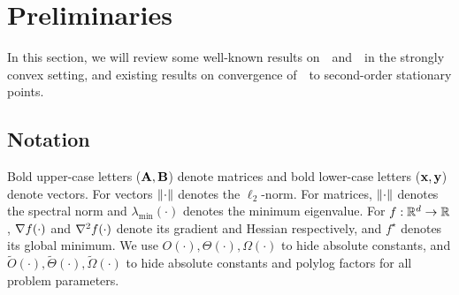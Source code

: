 
\section{Preliminaries}
In this section, we will review some well-known results on~\gd~and~\nag~in the strongly convex setting, 
and existing results on convergence of~\gd~to second-order stationary points. 


\subsection{Notation}
Bold upper-case letters ($\mathbf{A}, \mathbf{B}$) denote matrices and bold lower-case letters ($\mathbf{x}, \mathbf{y}$) denote vectors. 
For vectors $\left\|{\cdot}\right\|$ denotes the $\ell_2$-norm. For matrices, $\left\|{\cdot}\right\|$ denotes the spectral norm and $\lambda_{\min}(\cdot)$ denotes the minimum eigenvalue.
For $f: \mathbb{R}^d \rightarrow \mathbb{R}$, $\nabla f(\cdot)$ and  $\nabla^2 f(\cdot)$ denote its gradient and Hessian respectively, and $f^\star$ denotes its global minimum.
We use $O(\cdot), \Theta(\cdot), \Omega(\cdot)$ to hide absolute constants, and $\tilde{O}(\cdot), \tilde{\Theta}(\cdot), \tilde{\Omega}(\cdot)$ to hide absolute constants and polylog factors for all problem parameters. 



